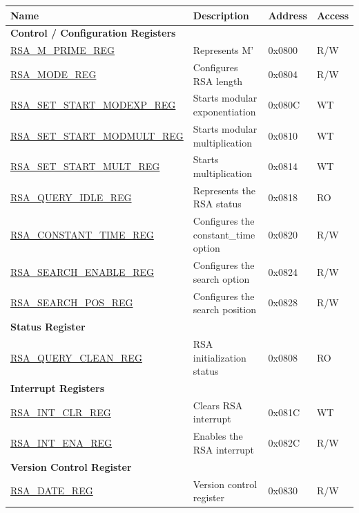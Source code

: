 \begin{longtable}{ | l | l | l | l | }
\hline\rowcolor{lightgray}
\textbf{Name} & \textbf{Description} &  \textbf{Address} & \textbf{Access} \\ \hline
\endhead
\multicolumn{4}{|l|}{\textbf{Control / Configuration Registers}} \\ \hline
\hyperref[regdesc:RSAMPRIMEREG]{RSA\_M\_PRIME\_REG} & Represents M' & 0x0800 & R/W \\ \hline
\hyperref[regdesc:RSAMODEREG]{RSA\_MODE\_REG} & Configures RSA length & 0x0804 & R/W \\ \hline
\hyperref[regdesc:RSASETSTARTMODEXPREG]{RSA\_SET\_START\_MODEXP\_REG} & Starts modular exponentiation & 0x080C & WT \\ \hline
\hyperref[regdesc:RSASETSTARTMODMULTREG]{RSA\_SET\_START\_MODMULT\_REG} & Starts modular multiplication & 0x0810 & WT \\ \hline
\hyperref[regdesc:RSASETSTARTMULTREG]{RSA\_SET\_START\_MULT\_REG} & Starts multiplication & 0x0814 & WT \\ \hline
\hyperref[regdesc:RSAQUERYIDLEREG]{RSA\_QUERY\_IDLE\_REG} & Represents the RSA status & 0x0818 & RO \\ \hline
\hyperref[regdesc:RSACONSTANTTIMEREG]{RSA\_CONSTANT\_TIME\_REG} & Configures the constant\_time option & 0x0820 & R/W \\ \hline
\hyperref[regdesc:RSASEARCHENABLEREG]{RSA\_SEARCH\_ENABLE\_REG} & Configures the search option & 0x0824 & R/W \\ \hline
\hyperref[regdesc:RSASEARCHPOSREG]{RSA\_SEARCH\_POS\_REG} & Configures the search position & 0x0828 & R/W \\ \hline
\multicolumn{4}{|l|}{\textbf{Status Register}} \\ \hline
\hyperref[regdesc:RSAQUERYCLEANREG]{RSA\_QUERY\_CLEAN\_REG} & RSA initialization status & 0x0808 & RO \\ \hline
\multicolumn{4}{|l|}{\textbf{Interrupt Registers}} \\ \hline
\hyperref[regdesc:RSAINTCLRREG]{RSA\_INT\_CLR\_REG} & Clears RSA interrupt & 0x081C & WT \\ \hline
\hyperref[regdesc:RSAINTENAREG]{RSA\_INT\_ENA\_REG} & Enables the RSA interrupt & 0x082C & R/W \\ \hline
\multicolumn{4}{|l|}{\textbf{Version Control Register}} \\ \hline
\hyperref[regdesc:RSADATEREG]{RSA\_DATE\_REG} & Version control register & 0x0830 & R/W \\ \hline
\end{longtable}
